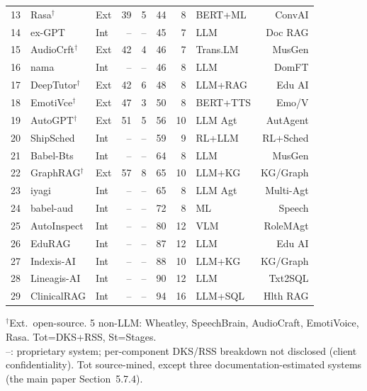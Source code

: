 \documentclass[10pt,a4paper]{article}
\begin{document}
\begin{table}[t]
\begin{tabular*}{\textwidth}{@{\extracolsep{\fill}}rllrrrrlr@{}}
13 & Rasa$^\dagger$         & Ext & 39 & 5  & 44 &  8 & BERT+ML   & ConvAI    \\
14 & ex-GPT              & Int & -- & -- & 45 &  7 & LLM       & Doc RAG   \\
15 & AudioCrft$^\dagger$ & Ext & 42 & 4  & 46 &  7 & Trans.LM  & MusGen    \\
16 & nama                & Int & -- & -- & 46 &  8 & LLM       & DomFT     \\
17 & DeepTutor$^\dagger$ & Ext & 42 & 6  & 48 &  8 & LLM+RAG   & Edu AI    \\
18 & EmotiVce$^\dagger$ & Ext & 47 & 3  & 50 &  8 & BERT+TTS  & Emo/V     \\
19 & AutoGPT$^\dagger$   & Ext & 51 & 5  & 56 & 10 & LLM Agt   & AutAgent  \\
20 & ShipSched           & Int & -- & -- & 59 &  9 & RL+LLM    & RL+Sched  \\
21 & Babel-Bts           & Int & -- & -- & 64 &  8 & LLM       & MusGen    \\
22 & GraphRAG$^\dagger$ & Ext & 57 & 8  & 65 & 10 & LLM+KG    & KG/Graph  \\
23 & iyagi               & Int & -- & -- & 65 &  8 & LLM Agt   & Multi-Agt \\
24 & babel-aud           & Int & -- & -- & 72 &  8 & ML        & Speech    \\
25 & AutoInspect         & Int & -- & -- & 80 & 12 & VLM       & RoleMAgt  \\
26 & EduRAG              & Int & -- & -- & 87 & 12 & LLM       & Edu AI    \\
27 & Indexis-AI          & Int & -- & -- & 88 & 10 & LLM+KG    & KG/Graph  \\
28 & Lineagis-AI         & Int & -- & -- & 90 & 12 & LLM       & Txt2SQL   \\
29 & ClinicalRAG         & Int & -- & -- & 94 & 16 & LLM+SQL   & Hlth RAG  \\
\bottomrule
\end{tabular*}
\par\smallskip
\parbox{\textwidth}{\footnotesize\raggedright
$^\dagger$Ext.\ open-source. 5 non-LLM: Wheatley, SpeechBrain, AudioCraft, EmotiVoice, Rasa. Tot=DKS+RSS, St=Stages.\\
--: proprietary system; per-component DKS/RSS breakdown not disclosed (client confidentiality). Tot source-mined, except three documentation-estimated systems (the main paper Section~5.7.4).}
\end{table}
\end{document}
